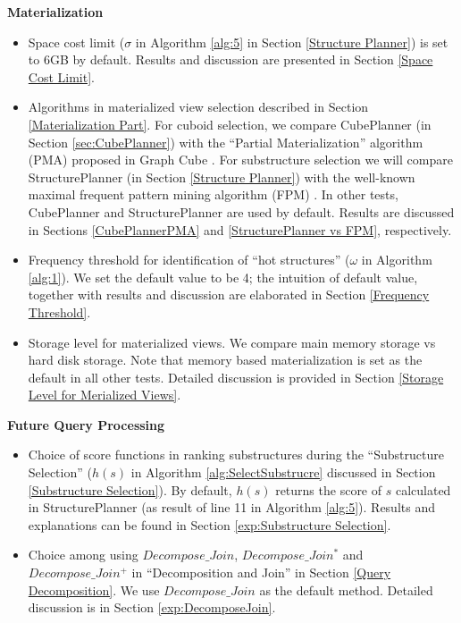 \textbf{Materialization}
\begin{itemize}
	
	\item  Space cost limit ($\sigma$ in Algorithm \ref{alg:5} in Section \ref{Structure Planner}) is set to 6GB by default. Results and discussion are presented in Section \ref{Space Cost Limit}.
	
	\item  Algorithms in materialized view selection described in Section \ref{Materialization Part}. For cuboid selection, we compare CubePlanner (in Section \ref{sec:CubePlanner}) with the ``Partial Materialization'' algorithm (PMA) proposed in Graph Cube \cite{sigmod11_ZhaoLXH11}. For substructure selection we will compare StructurePlanner (in Section \ref{Structure Planner}) with the well-known maximal frequent pattern mining algorithm (FPM) \cite{DBLP:conf/icdm/GoudaZ01}. In other tests, CubePlanner and StructurePlanner are used by default. Results are discussed in Sections \ref{CubePlannerPMA} and \ref{StructurePlanner vs FPM}, respectively.
	
	\item Frequency threshold for identification of “hot structures” ($\omega$ in Algorithm \ref{alg:1}). We set the default value to be 4; the intuition of default value, together with results and discussion are elaborated in Section \ref{Frequency Threshold}.
	
	\item Storage level for materialized views. We  compare main memory storage vs hard disk storage. Note that memory based materialization is set as the default in all other tests. Detailed discussion is provided in Section \ref{Storage Level for Merialized Views}.
	
\end{itemize}

\textbf{Future Query Processing}
\begin{itemize}
	\item  Choice of score functions in ranking substructures during the  ``Substructure Selection'' ($h(s)$ in Algorithm \ref{alg:SelectSubstrucre} discussed in Section \ref{Substructure Selection}). By default, $h(s)$ returns the score of $s$ calculated in StructurePlanner (as result of line 11 in Algorithm \ref{alg:5}). Results and explanations can be found in Section \ref{exp:Substructure Selection}.
	
	\item  Choice among using $Decompose\_Join$, $Decompose\_Join^{*}$ and $Decompose\_Join^{+}$ in ``Decomposition and Join'' in Section \ref{Query Decomposition}. We use $Decompose\_Join$ as the default method. Detailed discussion is in Section \ref{exp:DecomposeJoin}.
	
\end{itemize}

